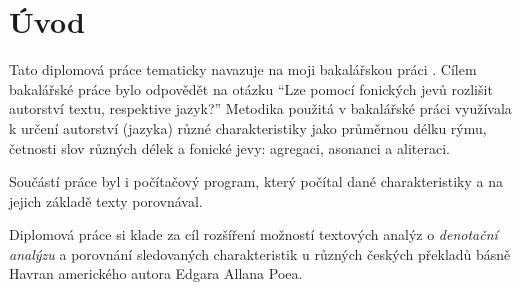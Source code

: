 \documentclass[dp.tex]{subfiles}
\begin{document}
\chapter*{Úvod}
\label{chap:uvod} 

Tato diplomová práce tematicky navazuje na moji bakalářskou práci . Cílem bakalářské práce bylo odpovědět na otázku \enquote{Lze pomocí fonických jevů rozlišit autorství textu, respektive jazyk?} Metodika použitá v bakalářské práci využívala k určení autorství (jazyka) různé charakteristiky jako průměrnou délku rýmu, četnosti slov různých délek a fonické jevy: agregaci, asonanci a aliteraci.

Součástí práce byl i počítačový program, který počítal dané charakteristiky a na jejich základě texty porovnával. 

Diplomová práce si klade za cíl rozšíření možností textových analýz o \textit{denotační analýzu} a porovnání sledovaných charakteristik u různých českých překladů básně Havran amerického autora Edgara Allana Poea.
\end{document}
